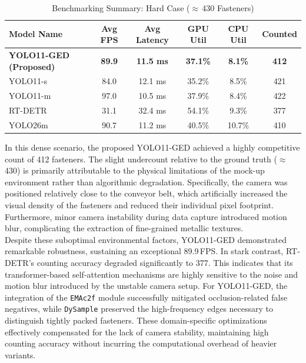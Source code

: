 \begin{table}[htbp]
    \centering
    \caption{Benchmarking Summary: Hard Case ($\approx$\,430 Fasteners)}
    \label{tab:benchmark_hard}
    \begin{tabular}{lccccc}
        \toprule
        \textbf{Model Name} & \textbf{Avg FPS} & \textbf{Avg Latency} & \textbf{GPU Util} & \textbf{CPU Util} & \textbf{Counted} \\
        \midrule
        \textbf{YOLO11-GED (Proposed)} & \textbf{89.9}  & \textbf{11.5 ms} & \textbf{37.1\%} & \textbf{8.1\%}  & \textbf{412} \\
        YOLO11-s             & 84.0           & 12.1 ms          & 35.2\%          & 8.5\%           & 421          \\
        YOLO11-m             & 97.0           & 10.5 ms          & 37.9\%          & 8.4\%           & 422          \\
        RT-DETR              & 31.1           & 32.4 ms          & 54.1\%          & 9.3\%           & 377          \\
        YOLO26m              & 90.7           & 11.2 ms          & 40.5\%          & 10.7\%          & 410          \\
        \bottomrule
    \end{tabular}
\end{table}

In this dense scenario, the proposed YOLO11-GED achieved a highly competitive count of 412 fasteners. The slight undercount relative to the ground truth ($\approx$\,430) is primarily attributable to the physical limitations of the mock-up environment rather than algorithmic degradation. Specifically, the camera was positioned relatively close to the conveyor belt, which artificially increased the visual density of the fasteners and reduced their individual pixel footprint. Furthermore, minor camera instability during data capture introduced motion blur, complicating the extraction of fine-grained metallic textures. \\

Despite these suboptimal environmental factors, YOLO11-GED demonstrated remarkable robustness, sustaining an exceptional 89.9\,FPS. In stark contrast, RT-DETR's counting accuracy degraded significantly to 377. This indicates that its transformer-based self-attention mechanisms are highly sensitive to the noise and motion blur introduced by the unstable camera setup. For YOLO11-GED, the integration of the \texttt{EMAc2f} module successfully mitigated occlusion-related false negatives, while \texttt{DySample} preserved the high-frequency edges necessary to distinguish tightly packed fasteners. These domain-specific optimizations effectively compensated for the lack of camera stability, maintaining high counting accuracy without incurring the computational overhead of heavier variants.

